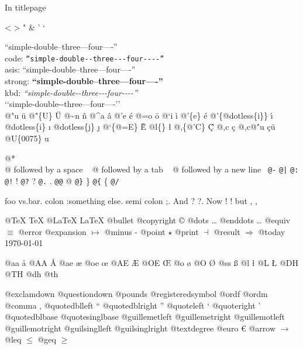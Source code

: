 \documentclass{book}
\begin{document}
\frontmatter




\begin{titlepage}
In titlepage

<
>
"
\&
'
`

``simple-double--three---four----''\leavevmode{}\\
code: \texttt{``simple-double{-}{-}three{-}{-}{-}four{-}{-}{-}-''} \leavevmode{}\\
asis: ``simple-double--three---four----'' \leavevmode{}\\
strong: \textbf{``simple-double--three---four----''} \leavevmode{}\\
kbd: {\ttfamily\textsl{``simple-double{-}{-}three{-}{-}{-}four{-}{-}{-}-''}} \leavevmode{}\\

`\hbox{}`simple-double-\hbox{}-three---four----'\hbox{}'\leavevmode{}\\


@"u \"{u} 
@"\{U\} \"{U} 
@\~{}n \~{n}
@\^{}a \^{a}
@'e \'{e}
@=o \={o}
@`i \`{i}
@'\{e\} \'{e}
@'\{@dotless\{i\}\} \'{\i{}} 
@dotless\{i\} \i{}
@dotless\{j\} \j{}
@`\{@=E\} \`{\={E}} 
@l\{\} \l{}
@,\{@'C\} \c{\'{C}}
@,c \c{c}
@,c@"u \c{c}\"{u} \leavevmode{}\\

@U\{0075\} u

@* \leavevmode{}\\
@ followed by a space
\ {}
@ followed by a tab
\ {}
@ followed by a new line
\ {}\texttt{@-} \-{}
\texttt{@|} 
\texttt{@:} \@
\texttt{@!} \@!
\texttt{@?} \@?
\texttt{@.} \@.
\texttt{@@} @
\texttt{@\}} \}
\texttt{@\{} \{
\texttt{@/} 

foo vs.\@ bar. 
colon :\@And something else.
semi colon ;\@.
And ? ?\@.
Now ! !\@@
but , ,\@

@TeX \TeX{}
@LaTeX \LaTeX{}
@bullet \textbullet{}
@copyright \copyright{}
@dots \dots{}\@
@enddots \dots{}
@equiv $\equiv{}$
@error 
@expansion $\mapsto{}$
@minus -
@point $\star{}$
@print $\dashv{}$
@result $\Rightarrow{}$
@today \today{}

@aa \aa{}
@AA \AA{}
@ae \ae{}
@oe \oe{}
@AE \AE{}
@OE \OE{}
@o \o{}
@O \O{}
@ss \ss{}
@l \l{}
@L \L{}
@DH \DH{}
@TH \TH{}
@dh \dh{}
@th \th{}

@exclamdown \textexclamdown{}
@questiondown \textquestiondown{}
@pounds \textsterling{}
@registeredsymbol \circledR{}
@ordf \textordfeminine{}
@ordm \textordmasculine{}
@comma ,
@quotedblleft \textquotedblleft{}
@quotedblright \textquotedblright{}
@quoteleft \textquoteleft{}
@quoteright \textquoteright{}
@quotedblbase \quotedblbase{}
@quotesinglbase \quotesinglbase{}
@guillemetleft \guillemotleft{}
@guillemetright \guillemotright{}
@guillemotleft \guillemotleft{}
@guillemotright \guillemotright{}
@guilsinglleft \guilsinglleft{}
@guilsinglright \guilsinglright{}
@textdegree \textdegree{}
@euro \euro{}
@arrow $\rightarrow{}$
@leq $\leq{}$
@geq $\geq{}$


\end{titlepage}
\end{document}
